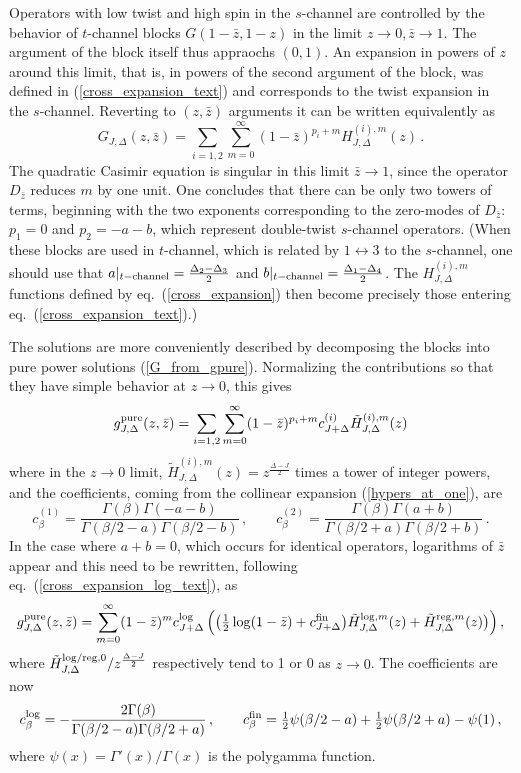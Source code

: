 \documentclass[11pt, reqno,preprint]{article}
\def\be{\begin{equation}}
\def\ee{\end{equation}}
\def\gpure{g^{\rm pure}}
\def\sreg{{\rm reg}}
\def\slog{{\rm log}}
\def\zbar{\bar{z}}
\def\j{J}
\begin{document}
\begin{appendix}
Operators with low twist and high spin in the $s$-channel are controlled by the behavior
of $t$-channel blocks $G(1-\zbar,1-z)$ in the limit $z\to 0,\zbar\to 1$. The argument of the block itself thus appraochs
$(0,1)$.
An expansion in powers of $z$ around this limit, that is, in powers of the second argument of the block,
was defined in (\ref{cross_expansion_text}) and corresponds to the twist expansion in the $s$-channel.
Reverting to $(z,\zbar)$ arguments it can be written equivalently as
\be
G_{\j,\Delta}(z,\zbar) = \sum_{i=1,2}\sum_{m=0}^\infty (1-\zbar)^{p_i+m}H_{\j,\Delta}^{(i),m}(z)\,.
 \label{cross_expansion}
\ee
The quadratic Casimir equation is singular in this limit $\zbar\to 1$, since the operator $D_{\zbar}$ reduces $m$ by one unit.
One concludes that there can be only two towers of terms, beginning with the two exponents
corresponding to the zero-modes of $D_{\zbar}$: $p_1=0$ and $p_2=-a-b$, which represent double-twist $s$-channel operators.
(When these blocks are used in $t$-channel, which is related by $1\leftrightarrow3$ to the $s$-channel, one should use that
$a|_{t-{\rm channel}}=\frac{\Delta_2-\Delta_3}{2}$ and $b|_{t-{\rm channel}}=\frac{\Delta_1-\Delta_4}{2}$. The $H_{\j,\Delta}^{(i),m}$
functions defined by eq.~(\ref{cross_expansion}) then become precisely those entering eq.~(\ref{cross_expansion_text}).)

The solutions are more conveniently described by decomposing the blocks into pure power solutions (\ref{G_from_gpure}).
Normalizing the contributions so that they have simple behavior at $z\to 0$,
this gives
\be
 \gpure_{\j,\Delta}(z,\zbar) = \sum_{i=1,2}\sum_{m=0}^\infty (1-\zbar)^{p_i+m}c^{(i)}_{\j+\Delta}\tilde{H}_{\j,\Delta}^{(i),m}(z)
 \label{cross_expansion1}
\ee
where in the $z\to 0$ limit, $\tilde{H}_{\j,\Delta}^{(i),m}(z)= z^{\frac{\Delta-\j}{2}}$ times a tower of integer powers,
and the coefficients, coming from the collinear expansion (\ref{hypers_at_one}), are
\be
 c^{(1)}_\beta = \frac{\Gamma(\beta)\Gamma(-a-b)}{\Gamma(\beta/2-a)\Gamma(\beta/2-b)}\,,\qquad
 c^{(2)}_\beta = \frac{\Gamma(\beta)\Gamma(a+b)}{\Gamma(\beta/2+a)\Gamma(\beta/2+b)}\,.
\ee
In the case where $a+b=0$, which occurs for identical operators, logarithms of $\zbar$ appear
and this need to be rewritten, following eq.~(\ref{cross_expansion_log_text}), as
\be\label{cross_expansion_log}
 \gpure_{\j,\Delta}(z,\zbar) =
 \sum_{m=0}^\infty (1-\zbar)^{m}
c^{\slog}_{\j+\Delta} 
 \left(\big(\tfrac12\log(1-\zbar)+c^{{\rm fin}}_{\j+\Delta}\big)\tilde{H}_{\j,\Delta}^{\slog,m}(z)+\tilde{H}_{\j,\Delta}^{\sreg,m}(z)\big)\right),
\ee
where $\tilde{H}^{\slog/\sreg,0}_{\j,\Delta}/z^{\frac{\Delta-\j}{2}}$ respectively tend to 1 or 0 as $z\to 0$.
The coefficients are now
\be
c^{\slog}_{\beta}= -\frac{2\Gamma(\beta)}{\Gamma(\beta/2-a)\Gamma(\beta/2+a)}\,,
\qquad
c^{{\rm fin}}_{\beta}= \tfrac12\psi(\beta/2-a)+\tfrac12\psi(\beta/2+a)-\psi(1)\,,
\ee
where $\psi(x)=\Gamma'(x)/\Gamma(x)$ is the polygamma function.


\end{appendix}
\end{document}
